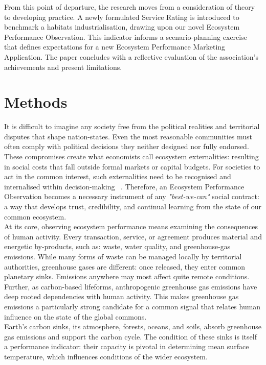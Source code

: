 \documentclass[10pt, oneside]{article}   	%
\begin{document}
From this point of departure, the research moves from a consideration of theory to developing practice.
A newly formulated Service Rating is introduced to benchmark a habitats industrialisation, drawing upon our novel Ecosystem Performance Observation.
This indicator informs a scenario-planning exercise that defines expectations for a new Ecosystem Performance Marketing Application.
The paper concludes with a reflective evaluation of the association's achievements and present limitations.\\

\section{Methods}

It is difficult to imagine any society free from the political realities and territorial disputes that shape nation-states.
Even the most reasonable communities must often comply with political decisions they neither designed nor fully endorsed.
These compromises create what economists call ecosystem externalities: resulting in social costs that fall outside formal markets or capital budgets.
For societies to act in the common interest, such externalities need to be recognised and internalised within decision-making ~\cite{rc1}.
Therefore, an Ecosystem Performance Observation becomes a necessary instrument of any \emph{"best-we-can"} social contract: a way that develops trust, credibility, and continual learning from the state of our common ecosystem.\\

At its core, observing ecosystem performance means examining the consequences of human activity.
Every transaction, service, or agreement produces material and energetic by-products, such as: waste, water quality, and greenhouse-gas emissions.
While many forms of waste can be managed locally by territorial authorities, greenhouse gases are different: once released, they enter common planetary sinks.
Emissions anywhere may most affect quite remote conditions.
Further, as carbon-based lifeforms, anthropogenic greenhouse gas emissions have deep rooted dependencies with human activity.
This makes greenhouse gas emissions a particularly strong candidate for a common signal that relates human influence on the state of the global commons.\\

Earth’s carbon sinks, its atmosphere, forests, oceans, and soils, absorb greenhouse gas emissions and support the carbon cycle.
The condition of these sinks is itself a performance indicator: their capacity is pivotal in determining mean surface temperature, which influences conditions of the wider ecosystem.\\
\end{document}
